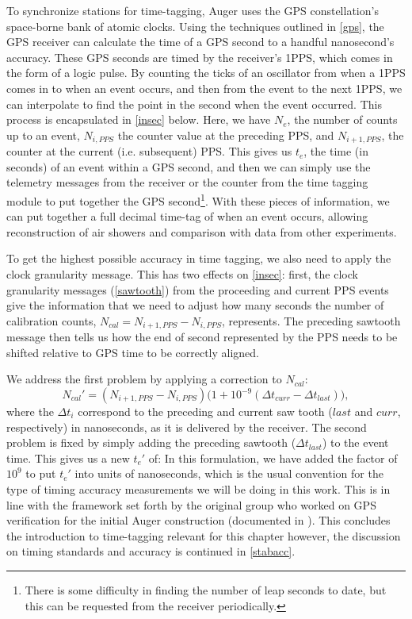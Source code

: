 To synchronize stations for time-tagging, Auger uses the GPS constellation's space-borne bank of atomic clocks. Using the techniques outlined in \autoref{gps}, the GPS receiver can calculate the time of a GPS second to a handful nanosecond's accuracy. These GPS seconds are timed by the receiver's 1PPS, which comes in the form of a logic pulse. By counting the ticks of an oscillator from when a 1PPS comes in to when an event occurs, and then from the event to the next 1PPS, we can interpolate to find the point in the second when the event occurred. This process is encapsulated in \autoref{insec} below. 
Here, we have $N_e$, the number of counts up to an event, $N_{i,PPS}$ the counter value at the preceding PPS, and $N_{i+1,PPS}$, the counter at the current (i.e. subsequent) PPS. This gives us $t_e$, the time (in seconds) of an event within a GPS second, and then we can simply use the telemetry messages from the receiver or the counter from the time tagging module to put together the GPS second\footnote{There is some difficulty in finding the number of leap seconds to date, but this can be requested from the receiver periodically.}. With these pieces of information, we can put together a full decimal time-tag of when an event occurs, allowing reconstruction of air showers and comparison with data from other experiments.

To get the highest possible accuracy in time tagging, we also need to apply the clock granularity message. This has two effects on \autoref{insec}: first, the clock granularity messages (\autoref{sawtooth}) from the proceeding and current PPS events give the information that we need to adjust how many seconds the number of calibration counts, $N_{cal}=N_{i+1,PPS}-N_{i,PPS}$, represents. The preceding sawtooth message then tells us how the end of second represented by the PPS needs to be shifted relative to GPS time to be correctly aligned.

We address the first problem by applying a correction to $N_{cal}$:
$$N_{cal}'=\left(N_{i+1,PPS}-N_{i,PPS}\right)\Big(1+10^{-9}(\Delta t_{curr}-\Delta t_{last})\Big),$$
where the $\Delta t_i$ correspond to the preceding and current saw tooth ($last$ and $curr$, respectively) in nanoseconds, as it is delivered by the receiver. The second problem is fixed by simply adding the preceding sawtooth ($\Delta t_{last}$) to the event time. This gives us a new $t_e'$ of:
In this formulation, we have added the factor of $10^9$ to put $t_e'$ into units of nanoseconds, which is the usual convention for the type of timing accuracy measurements we will be doing in this work. This is in line with the framework set forth by the original group who worked on GPS verification for the initial Auger construction (documented in ). This concludes the introduction to time-tagging relevant for this chapter however, the discussion on timing standards and accuracy is continued in \autoref{stabacc}.

